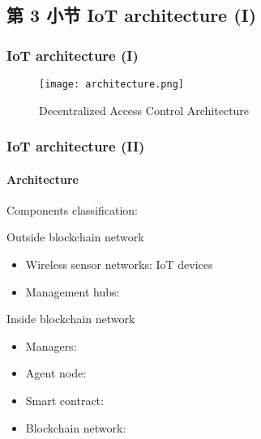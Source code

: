 \documentclass[
    aspectratio=169,                   %
]{beamer}
\begin{document}
\subsection{第 3 小节 IoT architecture (I)}

    \begin{frame}
        \frametitle{IoT architecture (I)}

            \begin{figure}
                \centering
                \begin{stampbox}
                    \texttt{[image: architecture.png]}
                \end{stampbox}
                \caption{Decentralized Access Control Architecture\cite{novo}}
            \end{figure}

        
    \end{frame}

    \begin{frame}
        \frametitle{IoT architecture (II)}

        \paragraph{Architecture} Components classification:

        \begin{block}{Outside blockchain network}
            \begin{itemize}
                \item \alert{Wireless sensor networks}: IoT devices 
                \item \alert{Management hubs}:
            \end{itemize}
        \end{block}

        \begin{block}{Inside blockchain network}
            \begin{itemize}
            \item \alert{Managers}: 
            \item \alert{Agent node}:
            \item \alert{Smart contract}: 
            \item \alert{Blockchain network}: 
            \end{itemize}
        \end{block}
    \end{frame}
\end{document}
